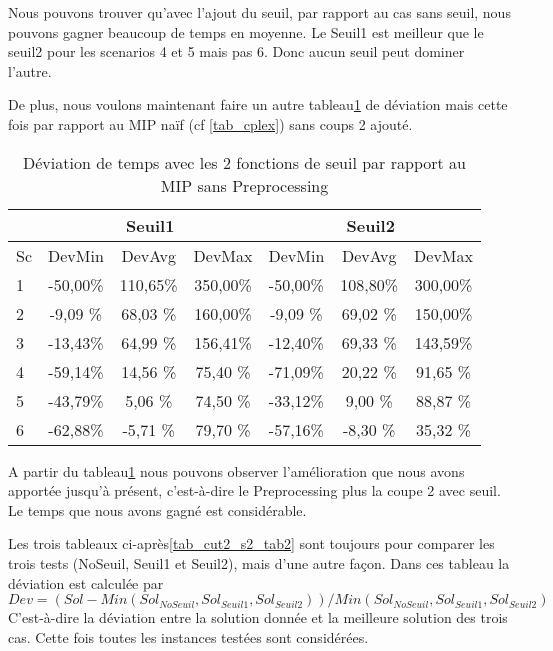 \documentclass[twoside,fleqn]{EPURapport}
\begin{document}
Nous pouvons trouver qu'avec l'ajout du seuil, par rapport au cas sans seuil, nous pouvons gagner beaucoup de temps en moyenne. Le Seuil1 est meilleur que le seuil2 pour les scenarios 4 et 5 mais pas 6. Donc aucun seuil peut dominer l'autre.

De plus, nous voulons maintenant faire un autre tableau\ref{tab_cut2_seuil_tim_cmp2} de déviation mais cette fois par rapport au MIP naïf (cf \ref{tab_cplex}) sans coups 2 ajouté.
\begin{table}[h]
    \centering
    \begin{tabular}{|l|c|c|c|c|c|c|}
    	\hline
  &\multicolumn{3}{c}{Seuil1}	&\multicolumn{3}{|c|}{Seuil2}\\ \hline
 Sc  & 	DevMin	& DevAvg	& DevMax& 	DevMin	& DevAvg	&DevMax  \\ \hline
1&	-50,00\%&	110,65\%&	350,00\%&	-50,00\%&	108,80\%&	300,00\%    \\ \hline
2&	-9,09 \%&	68,03 \%&	160,00\%&	-9,09 \%&	69,02 \%&	150,00\%     \\ \hline
3&	-13,43\%&	64,99 \%&	156,41\%&	-12,40\%&	69,33 \%&	143,59\%  \\ \hline
4&	-59,14\%&	14,56 \%&	75,40 \%&	-71,09\%&	20,22 \%&	91,65 \%    \\ \hline
5&	-43,79\%&	5,06	\%&74,50 \%&    -33,12\%&	9,00	\%&88,87  \%     \\ \hline
6&	-62,88\%&	-5,71 \%&	79,70 \%&	-57,16\%&	-8,30 \%&	35,32 \%  \\ \hline
    \end{tabular}
    \caption{Déviation de temps avec les 2 fonctions de seuil par rapport au MIP sans Preprocessing}
    \label{tab_cut2_seuil_tim_cmp2}
\end{table}
\bigskip

A partir du tableau\ref{tab_cut2_seuil_tim_cmp2} nous pouvons observer l'amélioration que nous avons apportée jusqu'à présent, c'est-à-dire le Preprocessing plus la coupe 2 avec seuil. Le temps que nous avons gagné est considérable.

Les trois tableaux ci-après\ref{tab_cut2_s2_tab2} sont toujours pour comparer les trois tests (NoSeuil, Seuil1 et Seuil2), mais d'une autre façon. Dans ces tableau la déviation est calculée par $$Dev = (Sol - Min(Sol_{NoSeuil}, Sol_{Seuil1}, Sol_{Seuil2}))/Min(Sol_{NoSeuil}, Sol_{Seuil1}, Sol_{Seuil2})$$C'est-à-dire la déviation entre la solution donnée et la meilleure solution des trois cas. Cette fois toutes les instances testées sont considérées. 
\end{document}
